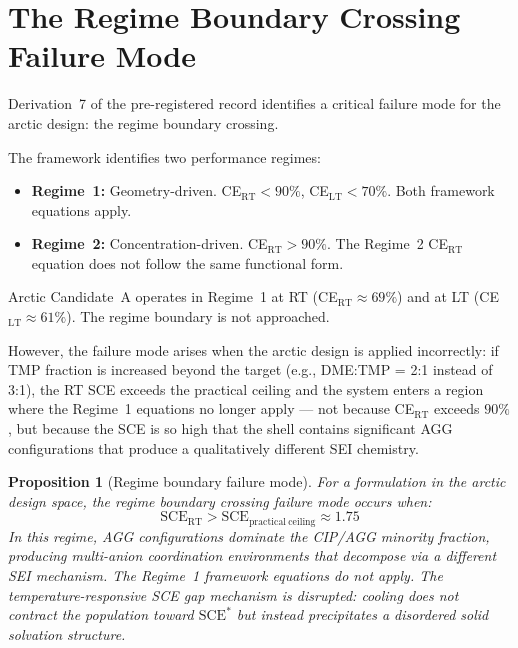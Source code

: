 \documentclass[11pt]{article}
\theoremstyle{plain}
\newtheorem{proposition}[theorem]{Proposition}
\theoremstyle{definition}
\theoremstyle{remark}
\begin{document}
\section{The Regime Boundary Crossing Failure Mode}
\label{sec:regime_boundary}

Derivation~7 of the pre-registered record identifies a critical
failure mode for the arctic design: the regime boundary crossing.

The framework identifies two performance regimes:
\begin{itemize}[leftmargin=2em]
  \item \textbf{Regime~1:} Geometry-driven.
        CE$_\mathrm{RT} < 90\%$, CE$_\mathrm{LT} < 70\%$.
        Both framework equations apply.
  \item \textbf{Regime~2:} Concentration-driven.
        CE$_\mathrm{RT} > 90\%$.  The Regime~2 CE$_\mathrm{RT}$
        equation does not follow the same functional form.
\end{itemize}

Arctic Candidate~A operates in Regime~1 at RT (CE$_\mathrm{RT}
\approx 69\%$) and at LT (CE$_\mathrm{LT} \approx 61\%$).
The regime boundary is not approached.

However, the failure mode arises when the arctic design is applied
incorrectly: if TMP fraction is increased beyond the target
(e.g., DME:TMP = 2:1 instead of 3:1), the RT SCE exceeds the
practical ceiling and the system enters a region where the
Regime~1 equations no longer apply --- not because CE$_\mathrm{RT}$
exceeds $90\%$, but because the SCE is so high that the shell
contains significant AGG configurations that produce a qualitatively
different SEI chemistry.

\begin{proposition}[Regime boundary failure mode]
For a formulation in the arctic design space, the regime boundary
crossing failure mode occurs when:
\begin{equation}
  \mathrm{SCE}_\mathrm{RT} > \mathrm{SCE}_\mathrm{practical~ceiling}
  \approx 1.75
\end{equation}
In this regime, AGG configurations dominate the CIP/AGG minority
fraction, producing multi-anion coordination environments that
decompose via a different SEI mechanism.  The Regime~1 framework
equations do not apply.  The temperature-responsive SCE gap
mechanism is disrupted: cooling does not contract the population
toward $\mathrm{SCE}^{*}$ but instead precipitates a disordered
solid solvation structure.
\end{proposition}
\end{document}
